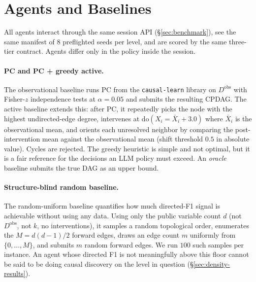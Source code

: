 \section{Agents and Baselines}
\label{sec:agents}

All agents interact through the same session API (\S\ref{sec:benchmark}), see the same manifest of $8$ preflighted seeds per level, and are scored by the same three-tier contract. Agents differ only in the policy inside the session.

\paragraph{PC and PC + greedy active.} The observational baseline runs PC from the \texttt{causal-learn} library on $D^{\mathrm{obs}}$ with Fisher-$z$ independence tests at $\alpha = 0.05$ and submits the resulting CPDAG. The active baseline extends this: after PC, it repeatedly picks the node with the highest undirected-edge degree, intervenes at $\mathrm{do}(X_i = \bar{X}_i + 3.0)$ where $\bar{X}_i$ is the observational mean, and orients each unresolved neighbor by comparing the post-intervention mean against the observational mean (shift threshold $0.5$ in absolute value). Cycles are rejected. The greedy heuristic is simple and not optimal, but it is a fair reference for the decisions an LLM policy must exceed. An \emph{oracle} baseline submits the true DAG as an upper bound.

\paragraph{Structure-blind random baseline.} The random-uniform baseline quantifies how much directed-F1 signal is achievable without using any data. Using only the public variable count $d$ (not $D^{\mathrm{obs}}$, not $k$, no interventions), it samples a random topological order, enumerates the $M = d(d-1)/2$ forward edges, draws an edge count $m$ uniformly from $\{0, \dots, M\}$, and submits $m$ random forward edges. We run $100$ such samples per instance. An agent whose directed F1 is not meaningfully above this floor cannot be said to be doing causal discovery on the level in question (\S\ref{sec:density-results}).

